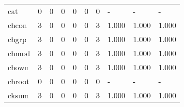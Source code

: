 \begin{longtable}{lp{2.0cm}p{2.0cm}p{2.0cm}p{2.0cm}p{2.0cm}p{2.0cm}p{2.0cm}p{2.0cm}p{2.0cm}}
cat       &                      0 &                                             0 &                                            0 &                                           0 &                                            0 &                                          0 &                                    - &                                      - &                                    - \\
chcon     &                      3 &                                             0 &                                            0 &                                           0 &                                            0 &                                          3 &                                1.000 &                                  1.000 &                                1.000 \\
chgrp     &                      3 &                                             0 &                                            0 &                                           0 &                                            0 &                                          3 &                                1.000 &                                  1.000 &                                1.000 \\
chmod     &                      3 &                                             0 &                                            0 &                                           0 &                                            0 &                                          3 &                                1.000 &                                  1.000 &                                1.000 \\
chown     &                      3 &                                             0 &                                            0 &                                           0 &                                            0 &                                          3 &                                1.000 &                                  1.000 &                                1.000 \\
chroot    &                      0 &                                             0 &                                            0 &                                           0 &                                            0 &                                          0 &                                    - &                                      - &                                    - \\
cksum     &                      3 &                                             0 &                                            0 &                                           0 &                                            0 &                                          3 &                                1.000 &                                  1.000 &                                1.000 \\

\end{longtable}
